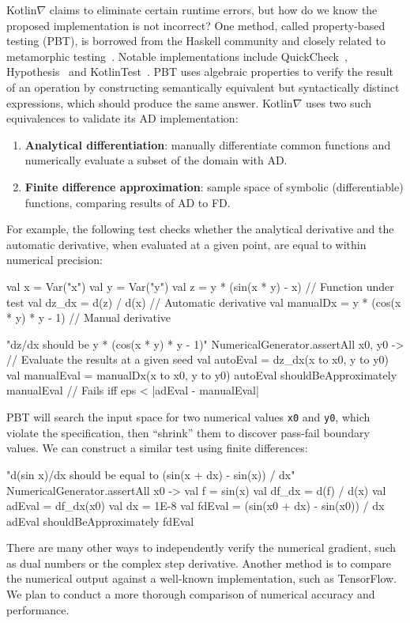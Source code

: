 \documentclass[12pt,initial,twoside,maitrise]{dms}
\def\inline{\lstinline[basicstyle=\ttfamily]}
\numberwithin{equation}{section}
\numberwithin{table}{chapter}
\numberwithin{figure}{chapter}
\begin{document}
Kotlin$\nabla$ claims to eliminate certain runtime errors, but how do we know the proposed implementation is not incorrect? One method, called property-based testing (PBT), is borrowed from the Haskell community and closely related to metamorphic testing~\citep{chen1998metamorphic}. Notable implementations include QuickCheck~\citep{claessen2011quickcheck}, Hypothesis~\citep{Hypothesis} and KotlinTest~\citep{kotlintest}. PBT uses algebraic properties to verify the result of an operation by constructing semantically equivalent but syntactically distinct expressions, which should produce the same answer. Kotlin$\nabla$ uses two such equivalences to validate its AD implementation: \\
%
\begin{enumerate}
    \item \textbf{Analytical differentiation}: manually differentiate common functions and numerically evaluate a subset of the domain with AD.
    \item \textbf{Finite difference approximation}: sample space of symbolic (differentiable) functions, comparing results of AD to FD. \\
\end{enumerate}
%
For example, the following test checks whether the analytical derivative and the automatic derivative, when evaluated at a given point, are equal to within numerical precision:
%
\begin{mylisting}[language=Kotlin, showstringspaces=false]
val x = Var("x")
val y = Var("y")
val z = y * (sin(x * y) - x)            // Function under test
val dz_dx = d(z) / d(x)                 // Automatic derivative
val manualDx = y * (cos(x * y) * y - 1) // Manual derivative

"dz/dx should be y * (cos(x * y) * y - 1)" {
    NumericalGenerator.assertAll { x0, y0 ->
        // Evaluate the results at a given seed
        val autoEval = dz_dx(x to x0, y to y0)
        val manualEval = manualDx(x to x0, y to y0)
        autoEval shouldBeApproximately manualEval // Fails iff eps < |adEval - manualEval|
    }
}
\end{mylisting}
%
PBT will search the input space for two numerical values \inline{x0} and \inline{y0}, which violate the specification, then ``shrink'' them to discover pass-fail boundary values. We can construct a similar test using finite differences:
%
\begin{mylisting}[language=Kotlin, showstringspaces=false]
"d(sin x)/dx should be equal to (sin(x + dx) - sin(x)) / dx" {
    NumericalGenerator.assertAll { x0 ->
        val f = sin(x)
        val df_dx = d(f) / d(x)
        val adEval = df_dx(x0)
        val dx = 1E-8
        val fdEval = (sin(x0 + dx) - sin(x0)) / dx
        adEval shouldBeApproximately fdEval
    }
}
\end{mylisting}
%
There are many other ways to independently verify the numerical gradient, such as dual numbers or the complex step derivative. Another method is to compare the numerical output against a well-known implementation, such as TensorFlow. We plan to conduct a more thorough comparison of numerical accuracy and performance.
\end{document}
